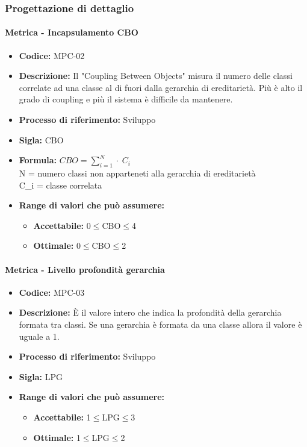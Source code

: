 \subsubsection{Progettazione di dettaglio}
    \paragraph{Metrica - Incapsulamento CBO}
    \begin{itemize}
        \item \textbf{Codice:} MPC-02
        \item \textbf{Descrizione:} Il "Coupling Between Objects" misura il numero delle classi correlate ad una classe al di fuori dalla gerarchia di ereditarietà. Più è alto il grado di coupling e più il sistema è difficile da mantenere.
        \item \textbf{Processo di riferimento:} Sviluppo
        \item \textbf{Sigla:} CBO
        \item \textbf{Formula:} \begin{math}{CBO = {\sum_{i=1}^{N} \cdot \; C_i}}\end{math} \\ N = numero classi non apparteneti alla gerarchia di ereditarietà \\ C_i = classe correlata
        \item \textbf{Range di valori che può assumere:}
        \begin{itemize}
            \item \textbf{Accettabile:} 0$\leq$CBO$\leq$4
            \item \textbf{Ottimale:} 0$\leq$CBO$\leq$2
        \end{itemize}
    \end{itemize}

    \paragraph{Metrica - Livello profondità gerarchia}
    \begin{itemize}
        \item \textbf{Codice:} MPC-03
        \item \textbf{Descrizione:} È il valore intero che indica la profondità della gerarchia formata tra classi. Se una gerarchia è formata da una classe allora il valore è uguale a 1.
        \item \textbf{Processo di riferimento:} Sviluppo
        \item \textbf{Sigla:} LPG
        \item \textbf{Range di valori che può assumere:}
        \begin{itemize}
            \item \textbf{Accettabile:} 1$\leq$LPG$\leq$3
            \item \textbf{Ottimale:} 1$\leq$LPG$\leq$2
        \end{itemize}
    \end{itemize}


